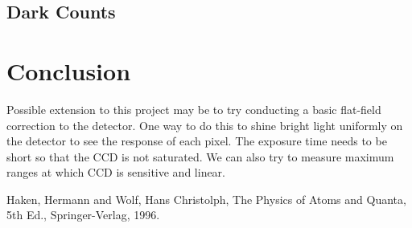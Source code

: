 \documentclass[authoryear, 12pt,5p, times]{elsarticle}
\begin{document}
 \subsection{Dark Counts}
 
\section{Conclusion}

Possible extension to this project may be to try conducting a basic flat-field correction to the detector. One way to do this to shine bright light uniformly on the detector to see the response of each pixel.  The exposure time needs to be short so that the CCD is not saturated. We can also try to measure maximum ranges at which CCD is sensitive and linear.

%
%
%

Haken, Hermann and Wolf, Hans Christolph, The Physics of Atoms and Quanta, 5th Ed., Springer-Verlag, 1996.
\end{document}
